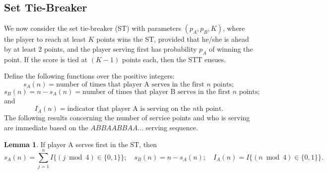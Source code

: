 \documentclass[11pt]{article}
\theoremstyle{plain}
\theoremstyle{definition}
\newtheorem{lemma}[theorem]{Lemma}
\newtheorem{proposition}[theorem]{Proposition}
\newcommand{\OLDPROOF}[1]{}
\begin{document}
\OLDPROOF{
\begin{proposition} [Serving order invariance]
    If the serving sequence in the set tie-breaker’s tie-breaker follows $ABABABAB \ldots$, that is, the players simply alternate serve, and assuming that neither of $(p_A=p_B=0)$ nor $(p_A=p_B=0)$ is true, then the probability of A winning the set tie-breaker's tie-breaker remains the same as under the original serving order. In particular,
    $$\theta_{STT}(p_A,p_B) = \frac{OR(p_A,p_B)}{1 + OR(p_A,p_B)}.$$
    Thus, the serving order does not affect the probability that A wins.
\end{proposition}

\begin{proof}
    The proof mirrors that of Proposition~\ref{A wins STT}. Based on the tree diagram in Figure~\ref{fig: STT diagram} (ii), we again obtain 
    $$\theta_{STT}(p_A,p_B) = \frac{(p_Aq_B)(1 + p_Ap_B + q_Aq_B)}{1 - (p_Ap_B +q_Aq_B)(q_Bq_A + p_Bp_A)}.$$

    The algebraic simplification proceeds identically and leads to the same expression
    $$\theta_{STT}(p_A,p_B) = \frac{OR(p_A,p_B)}{1 + OR(p_A,p_B)}.$$
    
    Therefore, alternate serving does not change the outcome probabilities.
\end{proof}
}

\subsection{Set Tie-Breaker}

We now consider the set tie-breaker (ST) with parameters $(p_A,p_B,K)$, where the player to reach at least $K$ points wins the ST, provided that he/she is ahead by at least 2 points, and the player serving first has probability $p_A$ of winning the point. If the score is tied at $(K-1)$ points each, then the STT ensues.

Define the following functions over the positive integers:
%
$$s_A(n) = \mbox{number of times that player A serves in the first $n$ points};$$
$$s_B(n) = n - s_A(n) = \mbox{number of times that player B serves in the first $n$ points};$$
and
$$I_A(n) = \mbox{indicator that player A is serving on the $n$th point}.$$
%
The following results concerning the number of service points and who is serving are immediate based on the $ABBAABBAA...$ serving sequence.

\begin{lemma}
    If player A serves first in the ST, then
    $$s_A(n) = \sum_{j=1}^n I\{(j \bmod 4) \in \{0,1\}\}; \quad s_B(n) = n - s_A(n); \quad 
    I_A(n) = I\{(n \bmod 4) \in \{0,1\}\}.$$
\end{lemma}
\end{document}
